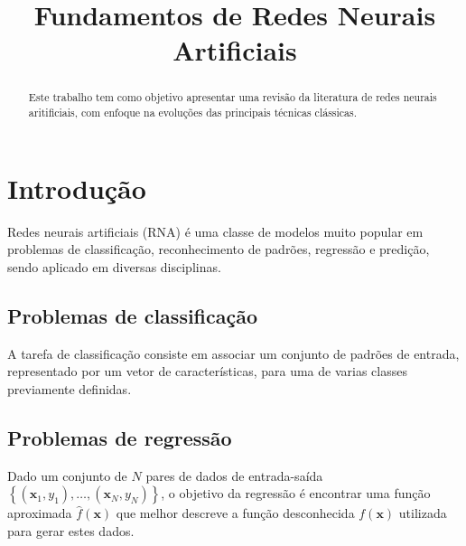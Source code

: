 \documentclass[conference]{IEEEtran}
\begin{document}
	
	\title{Fundamentos de Redes Neurais Artificiais}
	
	
	\author{
		}
	
	
	
	\maketitle
	
	\begin{abstract}
		Este trabalho tem como objetivo apresentar uma revisão da literatura de redes neurais aritificiais, com enfoque na evoluções das principais técnicas clássicas. 
	\end{abstract}

	\section{Introdução}
	Redes neurais artificiais (RNA) é uma classe de modelos muito popular em problemas de classificação, reconhecimento de padrões, regressão e predição, sendo aplicado em diversas disciplinas.
	
	\subsection{Problemas de classificação}
	A tarefa de classificação consiste em associar um conjunto de padrões de entrada, representado por um vetor de características, para uma de varias classes previamente definidas.

	\subsection{Problemas de regressão}
	Dado um conjunto de $N$ pares de dados de entrada-saída $\left\lbrace (\mathbf{x}_1, y_1), \dots, (\mathbf{x}_N, y_N)\right\rbrace$, o objetivo da regressão é encontrar uma função aproximada $\hat{f}(\mathbf{x})$ que melhor descreve a função desconhecida $f(\mathbf{x})$ utilizada para gerar estes dados.
\end{document}
